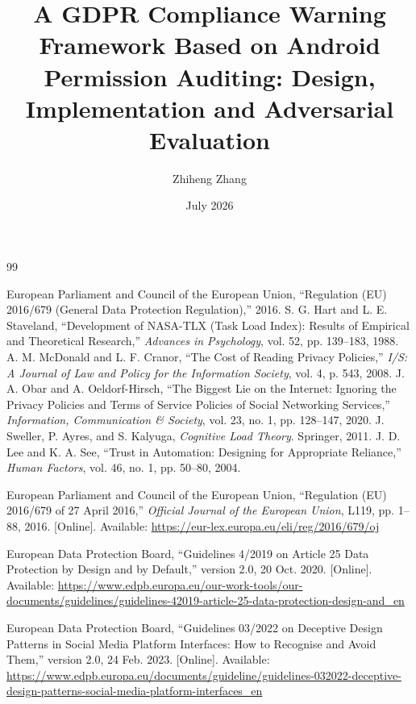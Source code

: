 \documentclass{article}
\title{A GDPR Compliance Warning Framework Based on Android Permission Auditing: Design, Implementation and Adversarial Evaluation}
\author{Zhiheng Zhang}
\date{July 2026}
\begin{document}
\maketitle
\newpage
\tableofcontents
\newpage










\begin{thebibliography}{99}

 European Parliament and Council of the European Union, ``Regulation (EU) 2016/679 (General Data Protection Regulation),'' 2016.
 S. G. Hart and L. E. Staveland, ``Development of NASA-TLX (Task Load Index): Results of Empirical and Theoretical Research,'' \emph{Advances in Psychology}, vol. 52, pp. 139--183, 1988.
 A. M. McDonald and L. F. Cranor, ``The Cost of Reading Privacy Policies,'' \emph{I/S: A Journal of Law and Policy for the Information Society}, vol. 4, p. 543, 2008.
 J. A. Obar and A. Oeldorf-Hirsch, ``The Biggest Lie on the Internet: Ignoring the Privacy Policies and Terms of Service Policies of Social Networking Services,'' \emph{Information, Communication \& Society}, vol. 23, no. 1, pp. 128--147, 2020.
 J. Sweller, P. Ayres, and S. Kalyuga, \emph{Cognitive Load Theory}. Springer, 2011.
 J. D. Lee and K. A. See, ``Trust in Automation: Designing for Appropriate Reliance,'' \emph{Human Factors}, vol. 46, no. 1, pp. 50--80, 2004.

 European Parliament and Council of the European Union, ``Regulation (EU) 2016/679 of 27 April 2016,'' \emph{Official Journal of the European Union}, L119, pp. 1--88, 2016. [Online]. Available: \url{https://eur-lex.europa.eu/eli/reg/2016/679/oj}

 European Data Protection Board, ``Guidelines 4/2019 on Article 25 Data Protection by Design and by Default,'' version 2.0, 20 Oct. 2020. [Online]. Available: \url{https://www.edpb.europa.eu/our-work-tools/our-documents/guidelines/guidelines-42019-article-25-data-protection-design-and_en}

 European Data Protection Board, ``Guidelines 03/2022 on Deceptive Design Patterns in Social Media Platform Interfaces: How to Recognise and Avoid Them,'' version 2.0, 24 Feb. 2023. [Online]. Available: \url{https://www.edpb.europa.eu/documents/guideline/guidelines-032022-deceptive-design-patterns-social-media-platform-interfaces_en}


\end{thebibliography}
\end{document}
